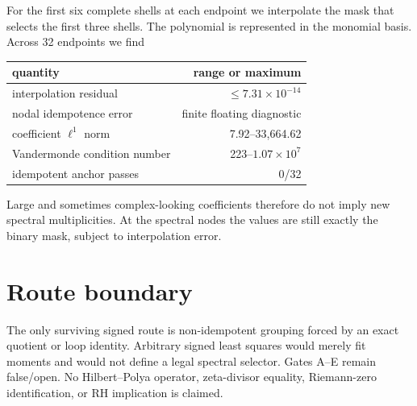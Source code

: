 \documentclass[11pt]{article}
\theoremstyle{remark}
\begin{document}
For the first six complete shells at each endpoint we interpolate the mask
that selects the first three shells.  The polynomial is represented in the
monomial basis.  Across 32 endpoints we find
\begin{center}
\small
\begin{tabular}{lr}
\toprule
quantity & range or maximum\\
\midrule
interpolation residual & $\le7.31\times10^{-14}$\\
nodal idempotence error & finite floating diagnostic\\
coefficient $\ell^1$ norm & 7.92--33,664.62\\
Vandermonde condition number & 223--$1.07\times10^7$\\
idempotent anchor passes & 0/32\\
\bottomrule
\end{tabular}
\end{center}
Large and sometimes complex-looking coefficients therefore do not imply new
spectral multiplicities.  At the spectral nodes the values are still exactly
the binary mask, subject to interpolation error.

\section{Route boundary}

The only surviving signed route is non-idempotent grouping forced by an exact
quotient or loop identity.  Arbitrary signed least squares would merely fit
moments and would not define a legal spectral selector.  Gates A--E remain
false/open.  No Hilbert--Polya operator, zeta-divisor equality, Riemann-zero
identification, or RH implication is claimed.



\end{document}
